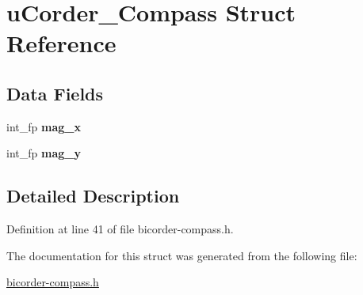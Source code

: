 \hypertarget{structuCorder__Compass}{}\section{u\+Corder\+\_\+\+Compass Struct Reference}
\label{structuCorder__Compass}
\subsection*{Data Fields}
\begin{DoxyCompactItemize}
\item 
int\+\_\+fp {\bfseries mag\+\_\+x}\hypertarget{structuCorder__Compass_af41d1cdaeeb99641aa280adacf2074dd}{}\label{structuCorder__Compass_af41d1cdaeeb99641aa280adacf2074dd}

\item 
int\+\_\+fp {\bfseries mag\+\_\+y}\hypertarget{structuCorder__Compass_ac29f03e0c84d9e4ff922482f0db83e07}{}\label{structuCorder__Compass_ac29f03e0c84d9e4ff922482f0db83e07}

\end{DoxyCompactItemize}


\subsection{Detailed Description}


Definition at line 41 of file bicorder-\/compass.\+h.



The documentation for this struct was generated from the following file\+:\begin{DoxyCompactItemize}
\item 
\hyperlink{bicorder-compass_8h}{bicorder-\/compass.\+h}\end{DoxyCompactItemize}
